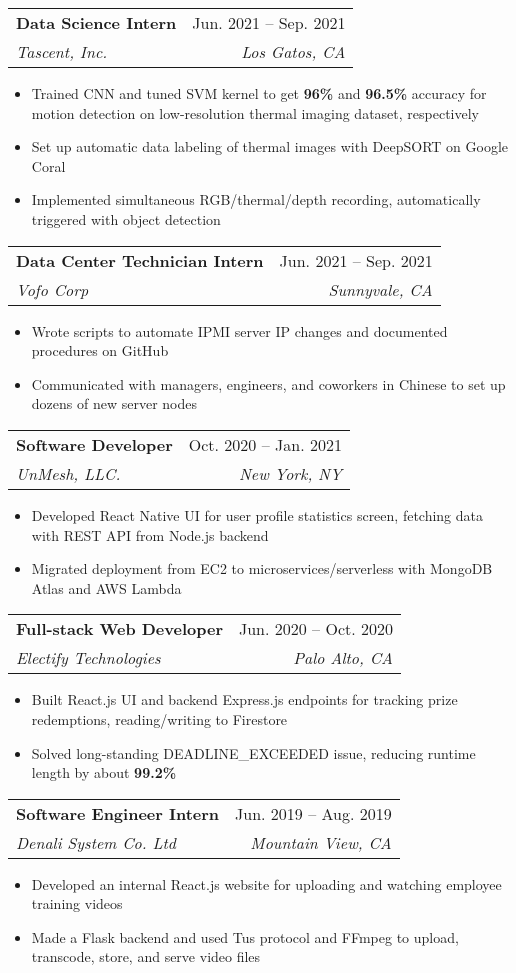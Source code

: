 \documentclass[letterpaper,11pt]{article}
\makeatletter
\newcommand{\resumeItem}[1]{
  \item\small{
    {#1 \vspace{-2pt}}
  }
}
\newcommand{\resumeSubheading}[4]{
  \vspace{-2pt}\item
    \begin{tabular*}{0.97\textwidth}[t]{l@{\extracolsep{\fill}}r}
      \textbf{#1} & #2 \\
      \textit{\small#3} & \textit{\small #4} \\
    \end{tabular*}\vspace{-7pt}
}
\newcommand{\resumeSubSubheading}[2]{
    \item
    \begin{tabular*}{0.97\textwidth}{l@{\extracolsep{\fill}}r}
      \textit{\small#1} & \textit{\small #2} \\
    \end{tabular*}\vspace{-7pt}
}
\newcommand{\resumeSubHeadingListEnd}{\end{itemize}}
\newcommand{\resumeItemListStart}{\begin{itemize}}
\newcommand{\resumeItemListEnd}{\end{itemize}\vspace{-5pt}}
\makeatother
\begin{document}

\resumeSubheading
{Data Science Intern}{Jun. 2021 -- Sep. 2021}
{Tascent, Inc.}{Los Gatos, CA}
\resumeItemListStart
\resumeItem{Trained CNN and tuned SVM kernel to get \textbf{96\%} and
  \textbf{96.5\%} accuracy for motion detection on low-resolution thermal imaging dataset, respectively}
\resumeItem{Set up automatic data labeling of thermal images with DeepSORT on Google Coral}
\resumeItem{Implemented simultaneous RGB/thermal/depth recording, automatically triggered with object detection}
\resumeItemListEnd

\resumeSubheading
{Data Center Technician Intern}{Jun. 2021 -- Sep. 2021}
{Vofo Corp}{Sunnyvale, CA}
\resumeItemListStart
\resumeItem{Wrote scripts to automate IPMI server IP changes and documented procedures on GitHub}
\resumeItem{Communicated with managers, engineers, and coworkers in Chinese to set up dozens of new server nodes}
\resumeItemListEnd

\resumeSubheading
{Software Developer}{Oct. 2020 -- Jan. 2021}
{UnMesh, LLC.}{New York, NY}
\resumeItemListStart
\resumeItem{Developed React Native UI for user profile statistics screen, fetching data with REST API from Node.js backend}
\resumeItem{Migrated deployment from EC2 to microservices/serverless with MongoDB Atlas and AWS Lambda}
\resumeItemListEnd

\resumeSubheading
{Full-stack Web Developer}{Jun. 2020 -- Oct. 2020}
{Electify Technologies}{Palo Alto, CA}
\resumeItemListStart
\resumeItem{Built React.js UI and backend Express.js endpoints for tracking prize redemptions, reading/writing to Firestore}
\resumeItem{Solved long-standing DEADLINE\_EXCEEDED issue, reducing runtime length by about \textbf{99.2\%}}
\resumeItemListEnd

\resumeSubheading
{Software Engineer Intern}{Jun. 2019 -- Aug. 2019}
{Denali System Co. Ltd}{Mountain View, CA}
\resumeItemListStart
\resumeItem{Developed an internal React.js website for uploading and watching employee training videos}
\resumeItem{Made a Flask backend and used Tus protocol and FFmpeg to upload, transcode, store, and serve video files}
\resumeItemListEnd
\end{document}
